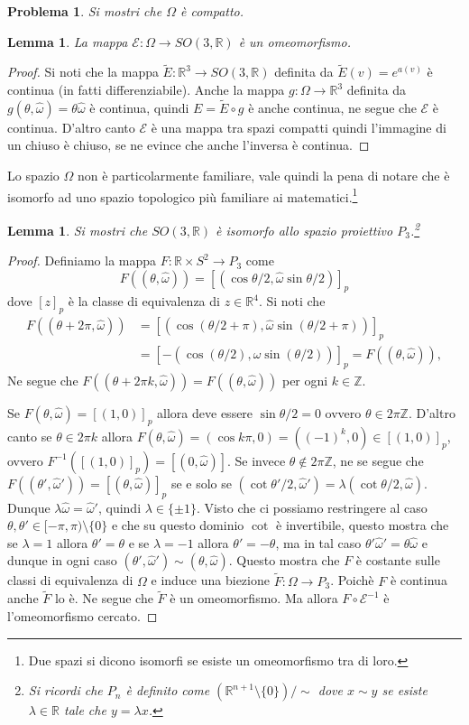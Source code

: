 \documentclass{amsart}
\numberwithin{equation}{section}
\newtheorem{lem}[thm]{Lemma}
\newtheorem{pro}{Problema}
\newcommand\cE{{\mathcal E}}
\newcommand\bR{{\mathbb R}}
\newcommand\bZ{{\mathbb Z}}
\newcommand{\homega}{\hat\omega}
\begin{document}
\begin{pro} Si mostri che $\Omega$ \`e compatto.
\end{pro}
\begin{lem} La mappa $\cE:\Omega\to SO(3,\bR)$ \`e un omeomorfismo.
\end{lem}
\begin{proof}
Si noti che la mappa $\widetilde E:\bR^3\to SO(3,\bR)$ definita da $\widetilde E(v)=e^{a(v)}$ \`e continua (in fatti differenziabile). Anche la mappa $g:\Omega\to\bR^3$ definita da $g(\theta,\homega)=\theta\homega$ \`e continua, quindi $E=\widetilde E\circ g$ \`e anche continua, ne segue che $\cE$ \`e continua. D'altro canto $\cE$ \`e una mappa tra spazi compatti quindi l'immagine di un chiuso \`e chiuso, se ne evince che anche l'inversa \`e continua.
\end{proof}
Lo spazio $\Omega$ non \`e particolarmente familiare, vale quindi la pena di notare che \`e isomorfo ad uno spazio topologico pi\`u familiare ai matematici.\footnote{ Due spazi si dicono isomorfi se esiste un omeomorfismo tra di loro.}
\begin{lem}
Si mostri che $SO(3,\bR)$ \`e isomorfo allo spazio proiettivo $P_3$.\footnote{ Si ricordi che $P_n$ \`e definito come $(\bR^{n+1}\setminus\{0\})/\sim$ dove $x\sim y$ se esiste $\lambda\in\bR$ tale che $y=\lambda x$.} 
\end{lem} 
\begin{proof}
Definiamo la mappa $F:\bR\times S^2\to P_3$ come
\[
F((\theta, \homega))=[(\cos\theta/2,  \homega\sin\theta/2)]_p 
\]
dove $[z]_p$ \`e la classe di equivalenza di $z\in\bR^4$. Si noti che 
\[
\begin{split}
F((\theta+2\pi, \homega))&=[(\cos(\theta/2+\pi),  \homega\sin(\theta/2+\pi))]_p\\
&=[-(\cos(\theta/2),  \homega\sin(\theta/2))]_p=F((\theta, \homega)),
\end{split}
\]
Ne segue che $F((\theta+2\pi k, \homega))=F((\theta, \homega))$ per ogni $k\in\bZ$.

Se $F(\theta,\homega)=[(1,0)]_p$ allora deve essere $\sin \theta/2=0$ ovvero $\theta\in 2\pi \bZ$. D'altro canto se $\theta\in 2\pi k$ allora $F(\theta,\homega)=(\cos k\pi, 0)=((-1)^k,0)\in [(1,0)]_p$, ovvero $F^{-1}([(1,0)]_p)=[(0,\homega)]$.  Se invece $\theta\not \in 2\pi\bZ$, ne se segue che $F((\theta',\homega'))=[(\theta,\homega)]_p$ se e solo se $(\cot\theta'/2,  \homega')=\lambda (\cot\theta/2,  \homega)$. Dunque $\lambda  \homega=\homega'$, quindi $\lambda\in \{\pm1\}$. Visto che ci possiamo restringere al caso $\theta, \theta'\in [-\pi,\pi)\setminus \{0\}$ e che su questo dominio $\cot$ \`e invertibile, questo mostra che se $\lambda=1$ allora $\theta'=\theta$  e se $\lambda=-1$ allora $\theta'=-\theta$, ma in tal caso $\theta'\homega'=\theta\homega$ e dunque in ogni caso $(\theta',\homega')\sim (\theta,\homega)$. Questo mostra che $F$ \`e costante sulle classi di equivalenza di $\Omega$ e induce una biezione  $\widetilde F:\Omega\to P_3$. Poich\`e $F$ \`e continua anche $\widetilde F$ lo \`e. Ne segue che $\widetilde F$ \`e un omeomorfismo.
Ma allora $F\circ \cE^{-1}$ \`e l'omeomorfismo cercato.
\end{proof}
\end{document}
